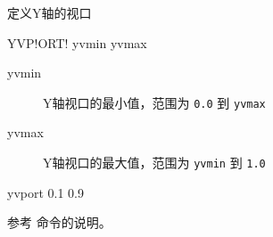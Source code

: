 \label{cmd:yvport}

定义Y轴的视口

\begin{SACSTX}
YVP!ORT! yvmin yvmax
\end{SACSTX}

\begin{description}
\item [yvmin] Y轴视口的最小值，范围为 \texttt{0.0} 到 \texttt{yvmax}
\item [yvmax] Y轴视口的最大值，范围为 \texttt{yvmin} 到 \texttt{1.0}
\end{description}

\begin{SACDFT}
yvport 0.1 0.9
\end{SACDFT}

参考  命令的说明。
